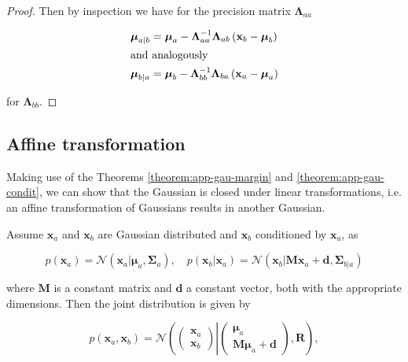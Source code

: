 \begin{appendices}
\begin{proof}
    Then by inspection we have for the precision matrix $\boldsymbol{\Lambda}_{a a}$

    \begin{subequations}
      \begin{align}
        \boldsymbol{\mu}_{a|b} &=  \boldsymbol{\mu}_{a}-\boldsymbol{\Lambda}_{a a}^{-1} \boldsymbol{\Lambda}_{a b}\left(\mathbf{x}_{b}-\boldsymbol{\mu}_{b}\right) \\
        \intertext{and analogously}
        \boldsymbol{\mu}_{b|a} &=  \boldsymbol{\mu}_{b}-\boldsymbol{\Lambda}_{b b}^{-1} \boldsymbol{\Lambda}_{b a}\left(\mathbf{x}_{a}-\boldsymbol{\mu}_{a}\right)
      \end{align}
    \end{subequations}

    for $\boldsymbol{\Lambda}_{bb}$.
  \end{proof}

  \subsection{Affine transformation}
  \label{subsec:app-affine-transf-gau}
  
  Making use of the Theorems \ref{theorem:app-gau-margin} and \ref{theorem:app-gau-condit}, we can show that the Gaussian is closed under linear transformations, i.e. an affine transformation of Gaussians results in another Gaussian.
  
  \begin{theorem}
    
    Assume $\mathbf{x}_a$ and $\mathbf{x}_b$ are Gaussian distributed and $\mathbf{x}_b$ conditioned by $\mathbf{x}_a$, as

    \begin{equation}
    p\left(\mathbf{x}_{a}\right) =\mathcal{N}\left(\mathbf{x}_{a} | \boldsymbol{\mu}_{a}, \boldsymbol{\Sigma}_{a}\right), \quad p\left(\mathbf{x}_{b} | \mathbf{x}_{a}\right) =\mathcal{N}\left(\mathbf{x}_{b} | \mathbf{M} \mathbf{x}_{a}+\mathbf{d}, \boldsymbol{\Sigma}_{b | a}\right)
    \end{equation}

    where $\mathbf{M}$ is a constant matrix and $\mathbf{d}$ a constant vector, both with the appropriate dimensions. Then the joint distribution is given by

    \begin{equation}
    p\left(\mathbf{x}_{a}, \mathbf{x}_{b}\right)=\mathcal{N}\left(\left(\begin{array}{c}{\mathbf{x}_{a}} \\ {\mathbf{x}_{b}}\end{array}\right) \left|\left(\begin{array}{c}{\boldsymbol{\mu}_{a}} \\ {\mathbf{M} \boldsymbol{\mu}_{a}+\mathbf{d}}\end{array}\right.\right), \mathbf{R}\right),
    \end{equation}


\end{theorem}
\end{appendices}
